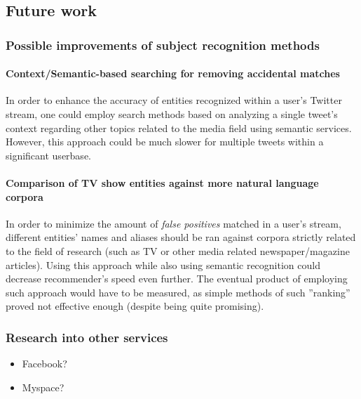 \subsection{Future work}

\subsubsection{Possible improvements of subject recognition methods}

\paragraph{Context/Semantic-based searching for removing accidental matches}
In order to enhance the accuracy of entities recognized within a user's Twitter stream, one could employ search methods
based on analyzing a single tweet's context regarding other topics related to the media field using semantic services.
However, this approach could be much slower for multiple tweets within a significant userbase.

\paragraph{Comparison of TV show entities against more natural language corpora}
In order to minimize the amount of \textit{false positives} matched in a user's stream, different entities' names and aliases
should be ran against corpora strictly related to the field of research (such as TV or other media related newspaper/magazine
articles). Using this approach while also using semantic recognition could decrease recommender's speed even further. The
eventual product of employing such approach would have to be measured, as simple methods of such ''ranking'' proved not effective enough (despite being quite promising).

\subsubsection{Research into other services}
\begin{itemize}
  \item Facebook?
  \item Myspace?
\end{itemize}